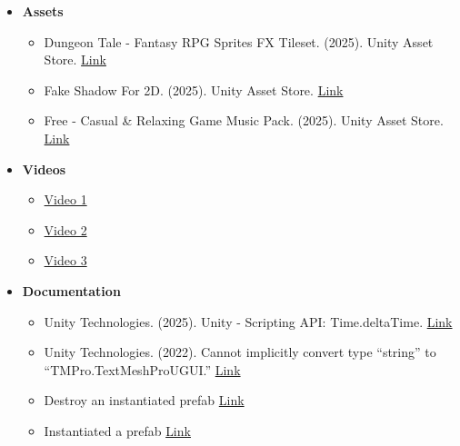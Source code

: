 \documentclass[11pt]{article}
\begin{document}
  \begin{itemize}
    \item \textbf{Assets}
    \begin{itemize}
      \item Dungeon Tale - Fantasy RPG Sprites FX Tileset. (2025). Unity Asset Store. \href{https://assetstore.unity.com/packages/2d/environments/dungeon-tale-fantasy-rpg-sprites-fx-tileset-296458}{Link}
      \item Fake Shadow For 2D. (2025). Unity Asset Store. \href{https://assetstore.unity.com/packages/2d/textures-materials/fake-shadow-for-2d-281626}{Link}
      \item Free - Casual \& Relaxing Game Music Pack. (2025). Unity Asset Store. \href{https://assetstore.unity.com/packages/audio/music/free-casual-relaxing-game-music-pack-262740}{Link}
    \end{itemize}
    
    \item \textbf{Videos}
    \begin{itemize}
      \item \href{https://www.youtube.com/watch?v=YNJM7rWbbxY}{Video 1}
      \item \href{https://www.youtube.com/watch?v=_YgeNG6MtQQ&t=3s}{Video 2}
      \item \href{https://www.youtube.com/watch?v=QQ3Yub9So2k&t=184s}{Video 3}
    \end{itemize}

    \item \textbf{Documentation}
    \begin{itemize}
      \item Unity Technologies. (2025). Unity - Scripting API: Time.deltaTime. \href{https://docs.unity3d.com/6000.0/Documentation/ScriptReference/Time-deltaTime.html}{Link}
      \item Unity Technologies. (2022). Cannot implicitly convert type “string” to “TMPro.TextMeshProUGUI.” \href{https://discussions.unity.com/t/cannot-implicitly-convert-type-string-to-tmpro-textmeshprougui/884511}{Link}
      \item Destroy an instantiated prefab \href{https://stackoverflow.com/questions/68317810/how-can-i-destroy-a-prefab-i-instantiated-unity}{Link}
      \item Instantiated a prefab \href{https://docs.unity3d.com/es/2019.4/Manual/InstantiatingPrefabs.html}{Link}
    \end{itemize}
    
  \end{itemize}
\end{document}
